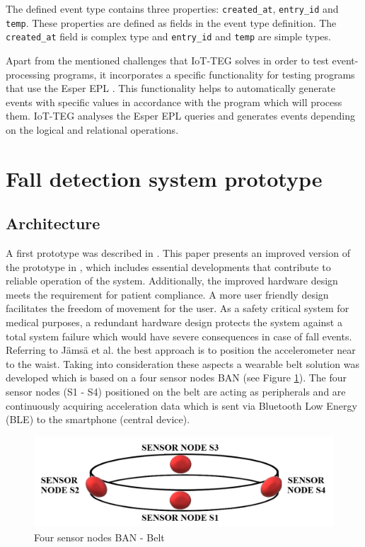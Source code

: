 \documentclass[10pt,journal,compsoc]{IEEEtran}
\begin{document}
The defined event type contains three properties: \texttt{created\_at},
\texttt{entry\_id} and \texttt{temp}. These properties are defined as
fields in the event type definition. The \texttt{created\_at} field is complex
type and \texttt{entry\_id} and \texttt{temp} are simple types. 

Apart from the mentioned challenges that IoT-TEG solves in order to test 
event-processing programs, it incorporates a specific functionality
for testing programs that use the Esper EPL \cite{Esper:2016}. 
This functionality helps to 
automatically generate events with specific values in accordance with the 
program which will process them. IoT-TEG analyses the Esper EPL queries and 
generates events depending on the logical and relational operations. 


\section{Fall detection system prototype}
\label{sec:fall-detectionPrototype}	

\subsection{Architecture}
\label{subsec:Architecture}	
 A first prototype was described in \cite{LaBlunda.2016, LaBlunda.2016b}. This paper presents an improved version of the prototype in \cite{LaBlunda.2016, LaBlunda.2016b}, which includes essential developments that contribute to reliable operation of the system. Additionally, the improved hardware design meets the requirement for patient compliance. A more user friendly design facilitates the freedom of movement for the user. As a safety critical system for medical purposes, a redundant hardware design protects the system against a total system failure which would have severe consequences in case of fall events. Referring to J{\"a}ms{\"a} et al. \cite{jamsa2014fall} the best approach is to position the accelerometer near to the waist. Taking into consideration these aspects a wearable belt solution was developed which is based on a four sensor nodes BAN (see Figure \ref{fig:BanBelt}). The four sensor nodes (S1 - S4) positioned on the belt are acting as peripherals and are continuously acquiring acceleration data which is sent via Bluetooth Low Energy (BLE) to the smartphone (central device). 
\begin{figure}[!ht]
	\centering
	\includegraphics[scale=0.25]{Images/belt}
	\caption[Four sensor nodes BAN - Belt]{Four sensor nodes BAN - Belt \cite{LaBlunda.2016, LaBlunda.2016b}}
	\label{fig:BanBelt}
\end{figure}
\end{document}
